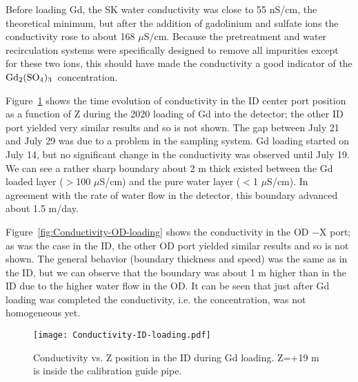 \documentclass[preprint,12pt]{elsarticle}
\newcommand{\GdSO}{$\rm Gd_2(\rm SO_4)_3$\ }
\begin{document}

Before loading Gd, the SK water conductivity was close to 55 nS/cm, the theoretical minimum, but after the addition of gadolinium and sulfate ions the conductivity rose to about 168 $\mu$S/cm. Because the pretreatment and water recirculation systems were specifically designed to remove all impurities except for these two ions, this should have made the conductivity a good indicator of the \GdSO concentration.

Figure~\ref{fig:Conductivity-ID-loading} shows the time evolution of conductivity in the ID center port position as a function of Z during the 2020 loading of Gd into the detector; the other ID port yielded very similar results and so is not shown. The gap between July 21 and July 29 was due to a problem in the sampling system. Gd loading started on July 14, but no significant change in the conductivity was observed until July 19. We can see a rather sharp boundary about 2 m thick existed between the Gd loaded layer ($>$100 $\mu$S/cm) and the pure water layer ($<$1 $\mu$S/cm). In agreement with the rate of water flow in the detector, this boundary advanced about 1.5 m/day. 

Figure~\ref{fig:Conductivity-OD-loading} shows the conductivity in the OD $-$X port; as was the case in the ID, the other OD port yielded similar results and so is not shown. The general behavior (boundary thickness and speed) was the same as in the ID, but we can observe that the boundary was about 1 m higher than in the ID due to the higher water flow in the OD. It can be seen that just after Gd loading was completed the conductivity, i.e. the concentration, was not homogeneous yet. 


\begin{figure}[htb]
\centering\texttt{[image: Conductivity-ID-loading.pdf]}
\caption{Conductivity vs. Z position in the ID during Gd loading. Z=+19 m is inside the calibration guide pipe.}
\label{fig:Conductivity-ID-loading}
\end{figure}
\end{document}
